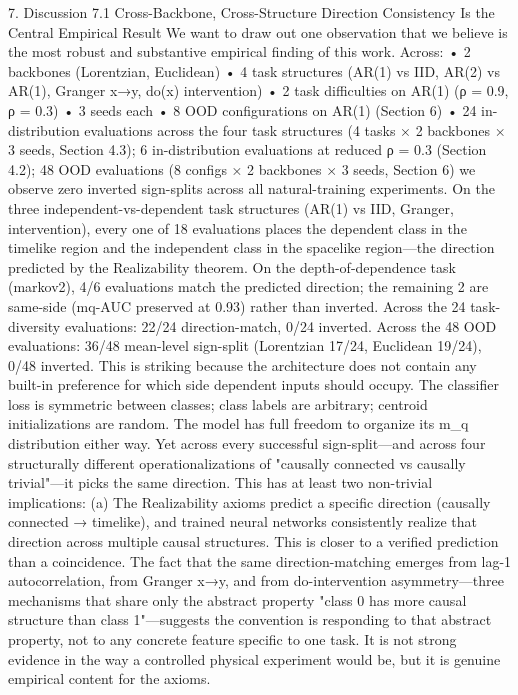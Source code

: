 7. Discussion
7.1 Cross-Backbone, Cross-Structure Direction Consistency Is the Central Empirical Result
We want to draw out one observation that we believe is the most robust and substantive empirical finding of this work. Across:
	•	2 backbones (Lorentzian, Euclidean)
	•	4 task structures (AR(1) vs IID, AR(2) vs AR(1), Granger x→y, do(x) intervention)
	•	2 task difficulties on AR(1) (ρ = 0.9, ρ = 0.3)
	•	3 seeds each
	•	8 OOD configurations on AR(1) (Section 6)
	•	24 in-distribution evaluations across the four task structures (4 tasks × 2 backbones × 3 seeds, Section 4.3); 6 in-distribution evaluations at reduced ρ = 0.3 (Section 4.2); 48 OOD evaluations (8 configs × 2 backbones × 3 seeds, Section 6)
we observe zero inverted sign-splits across all natural-training experiments. On the three independent-vs-dependent task structures (AR(1) vs IID, Granger, intervention), every one of 18 evaluations places the dependent class in the timelike region and the independent class in the spacelike region—the direction predicted by the Realizability theorem. On the depth-of-dependence task (markov2), 4/6 evaluations match the predicted direction; the remaining 2 are same-side (mq-AUC preserved at 0.93) rather than inverted. Across the 24 task-diversity evaluations: 22/24 direction-match, 0/24 inverted. Across the 48 OOD evaluations: 36/48 mean-level sign-split (Lorentzian 17/24, Euclidean 19/24), 0/48 inverted.
This is striking because the architecture does not contain any built-in preference for which side dependent inputs should occupy. The classifier loss is symmetric between classes; class labels are arbitrary; centroid initializations are random. The model has full freedom to organize its m_q distribution either way. Yet across every successful sign-split—and across four structurally different operationalizations of "causally connected vs causally trivial"—it picks the same direction.
This has at least two non-trivial implications:
(a) The Realizability axioms predict a specific direction (causally connected → timelike), and trained neural networks consistently realize that direction across multiple causal structures. This is closer to a verified prediction than a coincidence. The fact that the same direction-matching emerges from lag-1 autocorrelation, from Granger x→y, and from do-intervention asymmetry—three mechanisms that share only the abstract property "class 0 has more causal structure than class 1"—suggests the convention is responding to that abstract property, not to any concrete feature specific to one task. It is not strong evidence in the way a controlled physical experiment would be, but it is genuine empirical content for the axioms.
